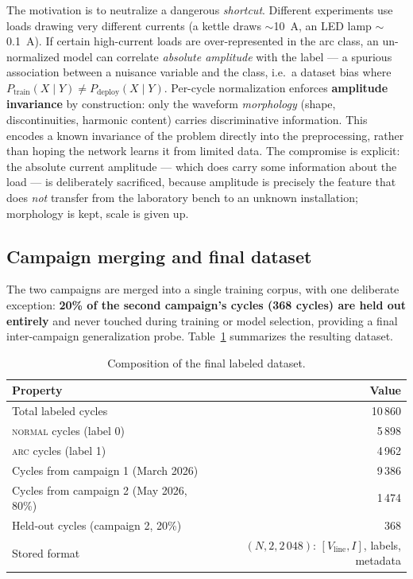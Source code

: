 The motivation is to neutralize a dangerous \emph{shortcut}. Different experiments use loads drawing very different currents (a kettle draws $\sim$10~A, an LED lamp $\sim$0.1~A). If certain high-current loads are over-represented in the arc class, an un-normalized model can correlate \emph{absolute amplitude} with the label --- a spurious association between a nuisance variable and the class, i.e.\ a dataset bias where $P_{\text{train}}(X \mid Y) \neq P_{\text{deploy}}(X \mid Y)$. Per-cycle normalization enforces \textbf{amplitude invariance} by construction: only the waveform \emph{morphology} (shape, discontinuities, harmonic content) carries discriminative information. This encodes a known invariance of the problem directly into the preprocessing, rather than hoping the network learns it from limited data. The compromise is explicit: the absolute current amplitude --- which does carry some information about the load --- is deliberately sacrificed, because amplitude is precisely the feature that does \emph{not} transfer from the laboratory bench to an unknown installation; morphology is kept, scale is given up.

\subsection{Campaign merging and final dataset}
\label{sec:merging}

The two campaigns are merged into a single training corpus, with one deliberate exception: \textbf{20\% of the second campaign's cycles (368 cycles) are held out entirely} and never touched during training or model selection, providing a final inter-campaign generalization probe. Table~\ref{tab:dataset} summarizes the resulting dataset.

\begin{table}[H]
\centering
\caption{Composition of the final labeled dataset.}
\label{tab:dataset}
\renewcommand{\arraystretch}{1.3}
\begin{tabular}{|l|r|}
\hline
\textbf{Property} & \textbf{Value} \\
\hline
Total labeled cycles & 10\,860 \\
\hline
\textsc{normal} cycles (label 0) & 5\,898 \\
\hline
\textsc{arc} cycles (label 1) & 4\,962 \\
\hline
Cycles from campaign 1 (March 2026) & 9\,386 \\
\hline
Cycles from campaign 2 (May 2026, 80\%) & 1\,474 \\
\hline
Held-out cycles (campaign 2, 20\%) & 368 \\
\hline
Stored format & $(N, 2, 2\,048)$: $[V_{\text{line}}, I]$, labels, metadata \\
\hline
\end{tabular}
\end{table}

